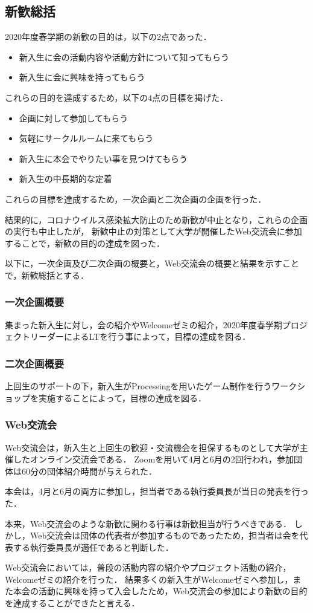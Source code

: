 

\subsection*{新歓総括}


2020年度春学期の新歓の目的は，以下の2点であった．

\begin{itemize}
    \item 新入生に会の活動内容や活動方針について知ってもらう
    \item 新入生に会に興味を持ってもらう
\end{itemize}

これらの目的を達成するため，以下の4点の目標を掲げた．

\begin{itemize}
    \item 企画に対して参加してもらう
    \item 気軽にサークルルームに来てもらう
    \item 新入生に本会でやりたい事を見つけてもらう
    \item 新入生の中長期的な定着
\end{itemize}

これらの目標を達成するため，一次企画と二次企画の企画を行った．

結果的に，コロナウイルス感染拡大防止のため新歓が中止となり，これらの企画の実行も中止したが，
新歓中止の対策として大学が開催したWeb交流会に参加することで，新歓の目的の達成を図った．

以下に，一次企画及び二次企画の概要と，Web交流会の概要と結果を示すことで，新歓総括とする．

\subsubsection*{一次企画概要}
集まった新入生に対し，会の紹介やWelcomeゼミの紹介，2020年度春学期プロジェクトリーダーによるLTを行う事によって，目標の達成を図る．

\subsubsection*{二次企画概要}
上回生のサポートの下，新入生がProcessingを用いたゲーム制作を行うワークショップを実施することによって，目標の達成を図る．

\subsubsection*{Web交流会}
Web交流会は，新入生と上回生の歓迎・交流機会を担保するものとして大学が主催したオンライン交流会である．
Zoomを用いて4月と6月の2回行われ，参加団体は60分の団体紹介時間が与えられた．

本会は，4月と6月の両方に参加し，担当者である執行委員長が当日の発表を行った．

本来，Web交流会のような新歓に関わる行事は新歓担当が行うべきである．
しかし，Web交流会は団体の代表者が参加するものであったため，担当者は会を代表する執行委員長が適任であると判断した．

Web交流会においては，普段の活動内容の紹介やプロジェクト活動の紹介，Welcomeゼミの紹介を行った．
結果多くの新入生がWelcomeゼミへ参加し，また本会の活動に興味を持って入会したため，Web交流会の参加により新歓の目的を達成することができたと言える．
